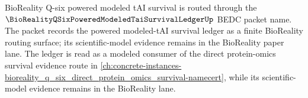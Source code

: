 BioReality Q-six powered modeled tAI survival is routed through the
$\BioRealityQSixPoweredModeledTaiSurvivalLedgerUp$ BEDC packet name.
The packet records the powered modeled-tAI survival ledger as a finite
BioReality routing surface; its scientific-model evidence remains in the
BioReality paper lane.
The ledger is read as a modeled consumer of the direct protein-omics survival evidence route in \autoref{ch:concrete-instances-bioreality_q_six_direct_protein_omics_survival-namecert}, while its scientific-model evidence remains in the BioReality lane.

